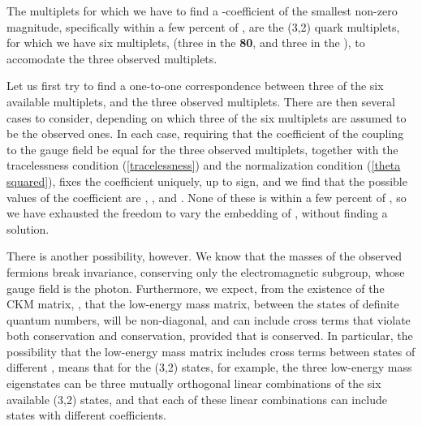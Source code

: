 \documentclass[a4paper,12pt,oneside]{article}
\begin{document}
The multiplets for which we have to find a \coordHE{}-coefficient of the
smallest non-zero magnitude, specifically within a few percent of
\coordHE{}, are the (3,2) quark multiplets, for which we
have six multiplets, (three in the \textbf{80}, and three in the
\coordHE{}), to accomodate the three observed 
multiplets.

Let us first try to find a one-to-one correspondence between three of the six available multiplets, and the three observed
multiplets.  There are then several cases to consider, depending on
which three of the six multiplets are assumed to be the observed 
ones.  In each case, requiring that the coefficient of the coupling
to the \coordHE{} gauge field be equal for the three observed
multiplets, together with the tracelessness condition 
(\ref{tracelessness}) and the normalization condition
(\ref{theta squared}), fixes the coefficient
uniquely, up to sign, and we find that the possible values of the 
coefficient are \coordHE{}, \coordHE{}, and 
\coordHE{}.  None of these is within a few percent 
of \coordHE{}, so we have 
exhausted the freedom to vary the embedding of \coordHE{},
without finding a solution.

There is another possibility, however.  We know that the masses of
the observed fermions break \coordHE{}
invariance, conserving only the electromagnetic \coordHE{}
subgroup, whose gauge field is the photon.  Furthermore, we expect,
from the existence of the CKM matrix, \cite{Cabibbo, KM, Rosner},
that the low-energy mass matrix, between the \coordHE{} states 
of definite 
\coordHE{} quantum 
numbers, will be non-diagonal, and can include cross terms that violate both \coordHE{} conservation and \coordHE{}
conservation, provided that \coordHE{} is
conserved.  In particular, the possibility that the low-energy mass
matrix includes cross terms between states of different \coordHE{}, means
that for the (3,2) states, for example, the three low-energy mass
eigenstates can be three mutually orthogonal linear combinations of
the six available (3,2) states, and that each of these linear
combinations can include states with different \coordHE{} coefficients.
\end{document}
